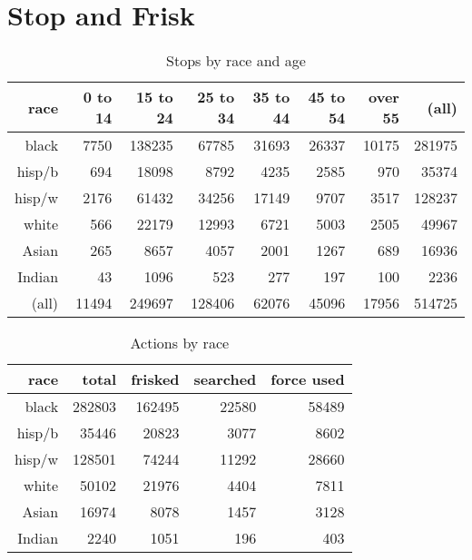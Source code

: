 \documentclass[letterpaper]{article}
\begin{document}
  \section{Stop and Frisk}

  \begin{table}[H]
    \centering
    \begin{tabular}{rrrrrrrr}
      \toprule
       race    & 0 to 14 & 15 to 24 & 25 to 34 & 35 to 44 & 45 to 54 & over 55 & (all) \\
      \midrule
      black    & 7750    & 138235   & 67785    & 31693    & 26337    & 10175   & 281975 \\
      hisp/b   & 694     & 18098    & 8792     & 4235     & 2585     & 970     & 35374 \\
      hisp/w   & 2176    & 61432    & 34256    & 17149    & 9707     & 3517    & 128237 \\
      white    & 566     & 22179    & 12993    & 6721     & 5003     & 2505    & 49967 \\
      Asian    & 265     & 8657     & 4057     & 2001     & 1267     & 689     & 16936 \\
      Indian   & 43      & 1096     & 523      & 277      & 197      & 100     & 2236 \\
      (all)    & 11494   & 249697   & 128406   & 62076    & 45096    & 17956   & 514725 \\
      \bottomrule
    \end{tabular}
    \caption{Stops by race and age}
  \end{table}

  \begin{table}[H]
    \centering
    \begin{tabular}{rrrrr}
      \toprule
      race     & total  & frisked & searched & force used \\
      \midrule
      black    & 282803 & 162495  & 22580    & 58489 \\
      hisp/b   & 35446  & 20823   & 3077     & 8602 \\
      hisp/w   & 128501 & 74244   & 11292    & 28660 \\
      white    & 50102  & 21976   & 4404     & 7811 \\
      Asian    & 16974  & 8078    & 1457     & 3128 \\
      Indian   & 2240   & 1051    & 196      & 403 \\
      \bottomrule
    \end{tabular}
    \caption{Actions by race}
  \end{table}
\end{document}
